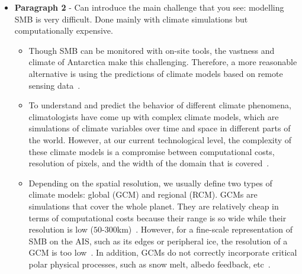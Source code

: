 \documentclass[a4paper,11pt,oneside]{report}
\begin{document}
\begin{itemize}
\begin{itemize}
        If Antarctica's ice sheet were to melt suddenly, sea levels would rise to approximately $60$\si{m}~\cite{Kittel, Fretwell, Morlighem}, making the AIS the most significant potential contributor to sea-level rise. Unfortunately, the AIS has been steadily losing mass since 2002~\cite{Shepherd, Mottram}, mainly because of calving\footnote{Calving is the process of chunks of ice breaking off from the edge of a glacier~\cite{Marshak}} and melting at the water-ice interface underneath ice shelves (submarine melting)~\cite{Kittel, Mottram, Rignot}. Because the SMB is a good indicator of stability and evolution of ice shelves, it is therefore imperative to have a precise estimation of the SMB of the AIS~\cite{icesheet}.
    \end{itemize}
    \item \textbf{Paragraph 2} - Can introduce the main challenge that you see: modelling SMB is very difficult. Done mainly with climate simulations but computationally expensive. 
    \begin{itemize}
        \item Though SMB can be monitored with on-site tools, the vastness and climate of Antarctica make this challenging. Therefore, a more reasonable alternative is using the predictions of climate models based on remote sensing data~\cite{Mottram, Lenaerts2019}.  
        \item To understand and predict the behavior of different climate phenomena, climatologists have come up with complex climate models, which are simulations of climate variables over time and space in different parts of the world. However, at our current technological level, the complexity of these climate models is a compromise between computational costs, resolution of pixels, and the width of the domain that is covered~\cite{Doury}. 
        \item Depending on the spatial resolution, we usually define two types of climate models: global (GCM) and regional (RCM). GCMs are simulations that cover the whole planet. They are relatively cheap in terms of computational costs because their range is so wide while their resolution is low ($50$-$300$\si{km})~\cite{Doury}. However, for a fine-scale representation of SMB on the AIS, such as its edges or peripheral ice, the resolution of a GCM is too low~\cite{Kittel, Seroussi}. In addition, GCMs do not correctly incorporate critical polar physical processes, such as snow melt, albedo feedback, etc~\cite{Kittel, Lenaerts2016}. 
        

\end{itemize}
\end{itemize}
\end{document}
